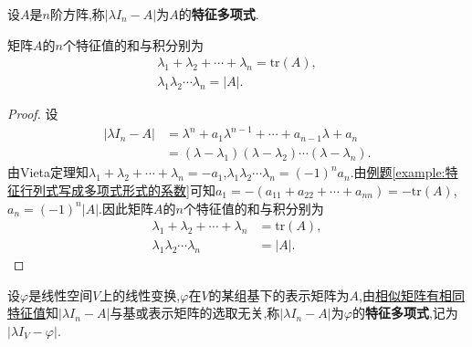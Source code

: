\documentclass[../../main.tex]{subfiles}%
\begin{document}
\begin{definition}[特征多项式]
设$A$是$n$阶方阵,称$|\lambda I_n - A|$为$A$的\textbf{特征多项式}.
\end{definition}

\begin{theorem}[特征值的和与积]\label{theorem:特征值的和与积}
矩阵$A$的$n$个特征值的和与积分别为
\begin{gather*}
\lambda_1 + \lambda_2 + \cdots + \lambda_n = \mathrm{tr}(A), \\
\lambda_1 \lambda_2 \cdots \lambda_n = |A|.
\end{gather*}
\end{theorem}
\begin{proof}

设
\begin{align*}
|\lambda I_n - A| &= \lambda^n + a_1 \lambda^{n-1} + \cdots + a_{n-1} \lambda + a_n \\
&= (\lambda - \lambda_1)(\lambda - \lambda_2) \cdots (\lambda - \lambda_n).
\end{align*}
由Vieta定理知$\lambda_1 + \lambda_2 + \cdots + \lambda_n = -a_1$,$\lambda_1 \lambda_2 \cdots \lambda_n = (-1)^n a_n$.由\hyperref[example:特征行列式写成多项式形式的系数]{例题\ref{example:特征行列式写成多项式形式的系数}}可知$a_1 = -(a_{11} + a_{22} + \cdots + a_{nn}) = -\mathrm{tr}(A)$,$a_n = (-1)^n |A|$.因此矩阵$A$的$n$个特征值的和与积分别为
\begin{align*}
\lambda_1 + \lambda_2 + \cdots + \lambda_n &= \mathrm{tr}(A), \\
\lambda_1 \lambda_2 \cdots \lambda_n &= |A|.
\end{align*}

\end{proof}

\begin{definition}[特征多项式]
设$\varphi$是线性空间$V$上的线性变换,$\varphi$在$V$的某组基下的表示矩阵为$A$,由\hyperref[theorem:相似矩阵有相同特征值]{相似矩阵有相同特征值}知$|\lambda I_n - A|$与基或表示矩阵的选取无关,称$|\lambda I_n - A|$为$\varphi$的\textbf{特征多项式},记为$|\lambda I_V - \varphi|$.
\end{definition}
\end{document}
